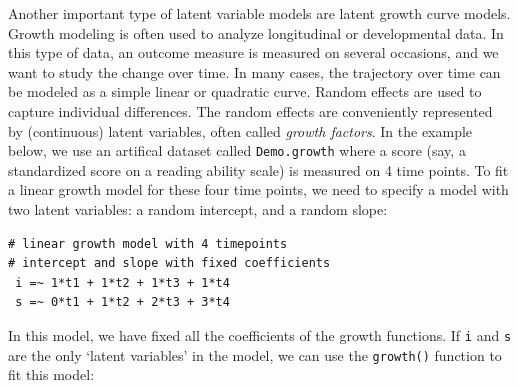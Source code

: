 Another important type of latent variable models are latent growth curve
models. Growth modeling is often used to analyze longitudinal or
developmental data. In this type of data, an outcome measure is measured
on several occasions, and we want to study the change over time. In many
cases, the trajectory over time can be modeled as a simple linear or
quadratic curve. Random effects are used to capture individual
differences. The random effects are conveniently represented by
(continuous) latent variables, often called \emph{growth factors}. In
the example below, we use an artifical dataset called
\texttt{Demo.growth} where a score (say, a standardized score on a
reading ability scale) is measured on 4 time points. To fit a linear
growth model for these four time points, we need to specify a model with
two latent variables: a random intercept, and a random slope:

\begin{verbatim}
# linear growth model with 4 timepoints
# intercept and slope with fixed coefficients
 i =~ 1*t1 + 1*t2 + 1*t3 + 1*t4
 s =~ 0*t1 + 1*t2 + 2*t3 + 3*t4
\end{verbatim}

In this model, we have fixed all the coefficients of the growth
functions. If \texttt{i} and \texttt{s} are the only `latent variables'
in the model, we can use the \texttt{growth()} function to fit this
model:

\begin{Shaded}
\begin{Highlighting}[]
\OtherTok{\textless{}{-}} 
\OtherTok{\textless{}{-}} 
\end{Highlighting}
\end{Shaded}

